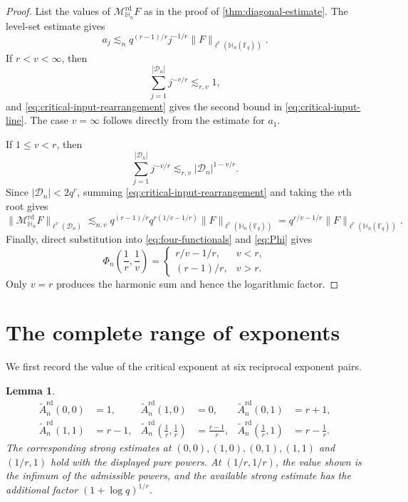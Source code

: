 \documentclass[11pt,letterpaper]{amsart}
\numberwithin{equation}{section}
\newtheorem{lemma}[lemma]{Lemma}
\theoremstyle{definition}
\theoremstyle{remark}
\newcommand{\Fq}{\mathbb F_q}
\newcommand{\HH}{\mathbb H}
\newcommand{\Dn}{\mathcal D_n}
\newcommand{\Mrd}{\mathcal M^{\mathrm{rd}}_{\HH_n}}
\newcommand{\norm}[1]{\lVert #1\rVert}
\begin{document}
\begin{proof}
List the values of $\Mrd F$ as in the proof of
\cref{thm:diagonal-estimate}. The level-set estimate gives
\begin{equation}\label{eq:critical-input-rearrangement}
 a_j
 \lesssim_n
 q^{(r-1)/r}j^{-1/r}
 \norm{F}_{\ell^r(\HH_n(\Fq))}.
\end{equation}
If $r<v<\infty$, then
\[
 \sum_{j=1}^{|\Dn|}j^{-v/r}\lesssim_{r,v}1,
\]
and \eqref{eq:critical-input-rearrangement} gives the second bound in
\eqref{eq:critical-input-line}. The case $v=\infty$ follows directly
from the estimate for $a_1$.

If $1\leq v<r$, then
\[
 \sum_{j=1}^{|\Dn|}j^{-v/r}
 \lesssim_{r,v}
 |\Dn|^{1-v/r}.
\]
Since $|\Dn|<2q^r$, summing \eqref{eq:critical-input-rearrangement} and taking the $v$th root gives
\[
 \norm{\Mrd F}_{\ell^v(\Dn)}
 \lesssim_{n,v}
 q^{(r-1)/r}q^{r(1/v-1/r)}
 \norm{F}_{\ell^r(\HH_n(\Fq))}
 =q^{r/v-1/r}
 \norm{F}_{\ell^r(\HH_n(\Fq))}.
\]
Finally, direct substitution into \eqref{eq:four-functionals} and
\eqref{eq:Phi} gives
\[
 \Phi_n\left(\frac1r,\frac1v\right)
 =
 \begin{cases}
  r/v-1/r,&v<r,\\
  (r-1)/r,&v>r.
 \end{cases}
\]
Only $v=r$ produces the harmonic sum and hence the logarithmic factor.
\end{proof}




\section{The complete range of exponents}
\label{sec:mixed-norm-estimates}

We first record the value of the critical exponent at six reciprocal
exponent pairs.

\begin{lemma}
\label{lem:six-values}
\begin{equation}\label{eq:six-values}
\begin{aligned}
 \widetilde A_n^{\mathrm{rd}}(0,0)&=1,
 &
 \widetilde A_n^{\mathrm{rd}}(1,0)&=0,
 &
 \widetilde A_n^{\mathrm{rd}}(0,1)&=r+1,\\
 \widetilde A_n^{\mathrm{rd}}(1,1)&=r-1,
 &
 \widetilde A_n^{\mathrm{rd}}\left(\frac1r,\frac1r\right)
 &=\frac{r-1}{r},
 &
 \widetilde A_n^{\mathrm{rd}}\left(\frac1r,1\right)
 &=r-\frac1r.
\end{aligned}
\end{equation}
The corresponding strong estimates at $(0,0),(1,0),(0,1),(1,1)$ and $(1/r,1)$ hold with the displayed pure powers. At $(1/r,1/r)$, the value shown is the infimum of the admissible powers, and the available strong estimate has the additional factor
$(1+\log q)^{1/r}$.
\end{lemma}
\end{document}

